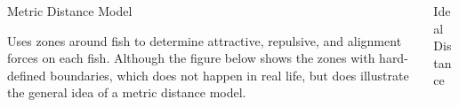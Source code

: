 \documentclass[final, xcolor=dvipsnames]{beamer}
\newlength{\onecolwid}
\newlength{\twocolwid}
\begin{document}
\begin{frame}[t]
\begin{columns}[t]
\begin{column}{\twocolwid}
\begin{columns}[t,totalwidth=\twocolwid] %

\begin{column}{\onecolwid}\vspace{-.6in} %


\begin{block}{Metric Distance Model}

Uses zones around fish to determine attractive, repulsive, and alignment forces on each fish.  Although the figure below shows the zones with hard-defined boundaries, which does not happen in real life, but does illustrate the general idea of a metric distance model.

\begin{figure}
	\centering
\end{figure}

\end{block}


\end{column} %

\begin{column}{\onecolwid}\vspace{-.6in} %


\begin{block}{Ideal Distance}


\end{block}
\end{column}
\end{columns}
\end{column}
\end{columns}
\end{frame}
\end{document}
